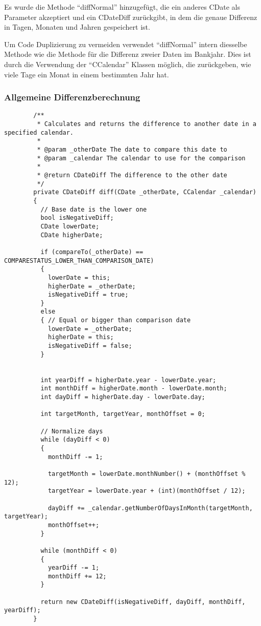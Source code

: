\documentclass[12pt,pdftex,parskip=half]{scrartcl}
\begin{document}
  Es wurde die Methode "`diffNormal"' hinzugefügt, die ein anderes CDate als Parameter akzeptiert und ein CDateDiff zurückgibt, in dem die genaue Differenz in Tagen, Monaten und Jahren gespeichert ist.

  Um Code Duplizierung zu vermeiden verwendet "`diffNormal"' intern diesselbe Methode wie die Methode für die Differenz zweier Daten im Bankjahr.
  Dies ist durch die Verwendung der "`CCalendar"' Klassen möglich, die zurückgeben, wie viele Tage ein Monat in einem bestimmten Jahr hat.

    \clearpage


    \subsubsection{Allgemeine Differenzberechnung} \label{4.4.1}
    \begin{lstlisting}
        /**
         * Calculates and returns the difference to another date in a specified calendar.
         *
         * @param _otherDate The date to compare this date to
         * @param _calendar The calendar to use for the comparison
         *
         * @return CDateDiff The difference to the other date
         */
        private CDateDiff diff(CDate _otherDate, CCalendar _calendar)
        {
          // Base date is the lower one
          bool isNegativeDiff;
          CDate lowerDate;
          CDate higherDate;

          if (compareTo(_otherDate) == COMPARESTATUS_LOWER_THAN_COMPARISON_DATE)
          {
            lowerDate = this;
            higherDate = _otherDate;
            isNegativeDiff = true;
          }
          else
          { // Equal or bigger than comparison date
            lowerDate = _otherDate;
            higherDate = this;
            isNegativeDiff = false;
          }


          int yearDiff = higherDate.year - lowerDate.year;
          int monthDiff = higherDate.month - lowerDate.month;
          int dayDiff = higherDate.day - lowerDate.day;

          int targetMonth, targetYear, monthOffset = 0;

          // Normalize days
          while (dayDiff < 0)
          {
            monthDiff -= 1;

            targetMonth = lowerDate.monthNumber() + (monthOffset % 12);
            targetYear = lowerDate.year + (int)(monthOffset / 12);

            dayDiff += _calendar.getNumberOfDaysInMonth(targetMonth, targetYear);
            monthOffset++;
          }

          while (monthDiff < 0)
          {
            yearDiff -= 1;
            monthDiff += 12;
          }

          return new CDateDiff(isNegativeDiff, dayDiff, monthDiff, yearDiff);
        }
    \end{lstlisting}
\end{document}
